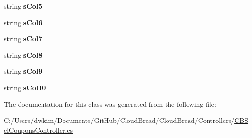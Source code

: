 \begin{DoxyCompactItemize}
\item 
string {\bfseries s\+Col5}\hypertarget{a00162_a081671f2531e8f5accaa17806181a0f3}{}\label{a00162_a081671f2531e8f5accaa17806181a0f3}

\item 
string {\bfseries s\+Col6}\hypertarget{a00162_aedcc497f59499c059497c15428d25490}{}\label{a00162_aedcc497f59499c059497c15428d25490}

\item 
string {\bfseries s\+Col7}\hypertarget{a00162_a258d109e8a11fe0c5e4961588ceee4d1}{}\label{a00162_a258d109e8a11fe0c5e4961588ceee4d1}

\item 
string {\bfseries s\+Col8}\hypertarget{a00162_a1b5968beb2f762f5fa1d2019f16ce4a1}{}\label{a00162_a1b5968beb2f762f5fa1d2019f16ce4a1}

\item 
string {\bfseries s\+Col9}\hypertarget{a00162_a3e17d8eba70cb06629a4cf0b2ef994ec}{}\label{a00162_a3e17d8eba70cb06629a4cf0b2ef994ec}

\item 
string {\bfseries s\+Col10}\hypertarget{a00162_ae38f5fb2ca3c9837742caa805e530113}{}\label{a00162_ae38f5fb2ca3c9837742caa805e530113}

\end{DoxyCompactItemize}


The documentation for this class was generated from the following file\+:\begin{DoxyCompactItemize}
\item 
C\+:/\+Users/dwkim/\+Documents/\+Git\+Hub/\+Cloud\+Bread/\+Cloud\+Bread/\+Controllers/\hyperlink{a00216}{C\+B\+Sel\+Coupons\+Controller.\+cs}\end{DoxyCompactItemize}
